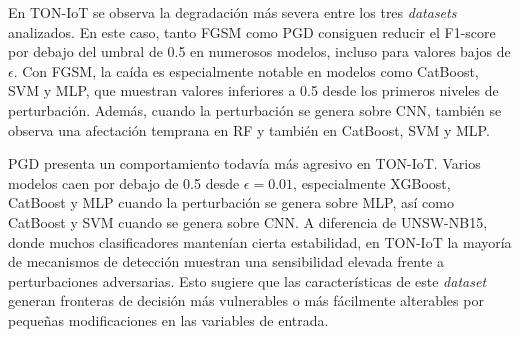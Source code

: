 \begin{table}[H]
\centering
\caption{F1-score de la clase ataque ante perturbaciones generadas sobre el modelo CNN}
\label{tab:f1_perturbacion_cnn_6}
\end{table}

En TON-IoT se observa la degradación más severa entre los tres \textit{datasets} analizados. En este caso, tanto FGSM como PGD consiguen reducir el F1-score por debajo del umbral de 0.5 en numerosos modelos, incluso para valores bajos de $\epsilon$. Con FGSM, la caída es especialmente notable en modelos como CatBoost, SVM y MLP, que muestran valores inferiores a 0.5 desde los primeros niveles de perturbación. Además, cuando la perturbación se genera sobre CNN, también se observa una afectación temprana en RF y también en CatBoost, SVM y MLP.

PGD presenta un comportamiento todavía más agresivo en TON-IoT. Varios modelos caen por debajo de 0.5 desde $\epsilon = 0.01$, especialmente XGBoost, CatBoost y MLP cuando la perturbación se genera sobre MLP, así como CatBoost y SVM cuando se genera sobre CNN. A diferencia de UNSW-NB15, donde muchos clasificadores mantenían cierta estabilidad, en TON-IoT la mayoría de mecanismos de detección muestran una sensibilidad elevada frente a perturbaciones adversarias. Esto sugiere que las características de este \textit{dataset} generan fronteras de decisión más vulnerables o más fácilmente alterables por pequeñas modificaciones en las variables de entrada.

